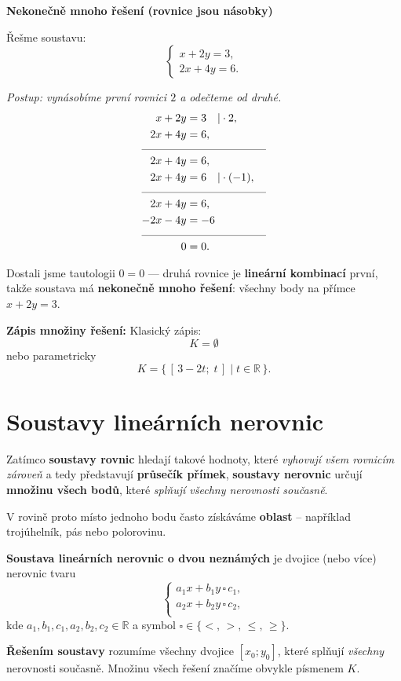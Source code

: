 \documentclass[12pt,a4paper]{article}
\begin{document}
\newpage
\begin{examplebox}
\textbf{Nekonečně mnoho řešení (rovnice jsou násobky)}

Řešme soustavu:
\[
\begin{cases}
x + 2y = 3,\\
2x + 4y = 6.
\end{cases}
\]

\textit{Postup: vynásobíme první rovnici $2$ a odečteme od druhé.}
\begin{align*}
x + 2y &= 3 \quad |\cdot 2,\\
2x + 4y &= 6,\\[-4pt]
\multicolumn{2}{c}{\rule{4cm}{0.3pt}}\\[-2pt]
2x + 4y &= 6,\\
2x + 4y &= 6 \quad | \cdot(-1),\\[-4pt]
\multicolumn{2}{c}{\rule{4cm}{0.3pt}}\\[-2pt]
2x + 4y &= 6,\\
-2x - 4y &= -6 \\[-4pt]
\multicolumn{2}{c}{\rule{4cm}{0.3pt}}\\[-2pt]
0 &= 0.
\end{align*}

Dostali jsme tautologii \(0=0\) — druhá rovnice je \textbf{lineární kombinací} první, takže soustava má \textbf{nekonečně mnoho řešení}: všechny body na přímce \(x + 2y = 3\).

\medskip
\textbf{Zápis množiny řešení:}
\newline
Klasický zápis:
\[
K=\emptyset
\]
nebo parametricky
\[
K = \bigl\{\, [\,3-2t;\; t\,] \;\big|\; t\in\mathbb{R} \,\bigr\}.
\]
\end{examplebox}



\newpage
\section{Soustavy lineárních nerovnic}

Zatímco \textbf{soustavy rovnic} hledají takové hodnoty, které \emph{vyhovují všem rovnicím zároveň} a tedy představují \textbf{průsečík přímek},  
\textbf{soustavy nerovnic} určují \textbf{množinu všech bodů}, které \emph{splňují všechny nerovnosti současně}.  

V rovině proto místo jednoho bodu často získáváme \textbf{oblast} – například trojúhelník, pás nebo polorovinu.

\begin{definitionbox}
\textbf{Soustava lineárních nerovnic o dvou neznámých} je dvojice (nebo více) nerovnic tvaru
\[
\begin{cases}
a_1x + b_1y \,\square\, c_1,\\[4pt]
a_2x + b_2y \,\square\, c_2,\\[2pt]
\end{cases}
\]
kde \(a_1, b_1, c_1, a_2, b_2, c_2  \in \mathbb{R}\) a symbol \(\square \in \{<,\,>,\,\le,\,\ge\}\).  

\textbf{Řešením soustavy} rozumíme všechny dvojice \([x_0;y_0]\), které splňují \emph{všechny} nerovnosti současně.  
Množinu všech řešení značíme obvykle písmenem \(K\).
\end{definitionbox}
\end{document}

